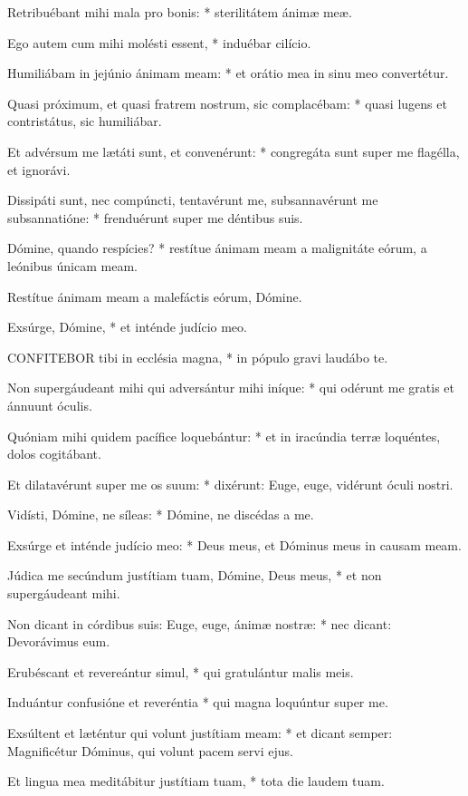 Retribuébant mihi mala pro bonis: * sterilitátem ánimæ meæ.

Ego autem cum mihi molésti essent, * induébar cilício.

Humiliábam in jejúnio ánimam meam: * et orátio mea in sinu meo convertétur.

Quasi próximum, et quasi fratrem nostrum, sic complacébam: * quasi lugens et contristátus, sic humiliábar.

Et advérsum me lætáti sunt, et convenérunt: * congregáta sunt super me flagélla, et ignorávi.

Dissipáti sunt, nec compúncti, tentavérunt me, subsannavérunt me subsannatióne: * frenduérunt super me déntibus suis.

Dómine, quando respícies? * restítue ánimam meam a malignitáte eórum, a leónibus únicam meam.

 Restítue ánimam meam a malefáctis eórum, Dómine.

 Exsúrge, Dómine, * et inténde judício meo.


\lettrine[lines=2]{C}{ONFITEBOR} tibi in ecclésia magna, * in pópulo gravi laudábo te.

Non supergáudeant mihi qui adversántur mihi iníque: * qui odérunt me gratis et ánnuunt óculis.

Quóniam mihi quidem pacífice loquebántur: * et in iracúndia terræ loquéntes, dolos cogitábant.

Et dilatavérunt super me os suum: * dixérunt: Euge, euge, vidérunt óculi nostri.

Vidísti, Dómine, ne síleas: * Dómine, ne discédas a me.

Exsúrge et inténde judício meo: * Deus meus, et Dóminus meus in causam meam.

Júdica me secúndum justítiam tuam, Dómine, Deus meus, * et non supergáudeant mihi.

Non dicant in córdibus suis: Euge, euge, ánimæ nostræ: * nec dicant: Devorávimus eum.

Erubéscant et revereántur simul, * qui gratulántur malis meis.

Induántur confusióne et reveréntia * qui magna loquúntur super me.

Exsúltent et læténtur qui volunt justítiam meam: * et dicant semper: Magnificétur Dóminus, qui volunt pacem servi ejus.

Et lingua mea meditábitur justítiam tuam, * tota die laudem tuam.


